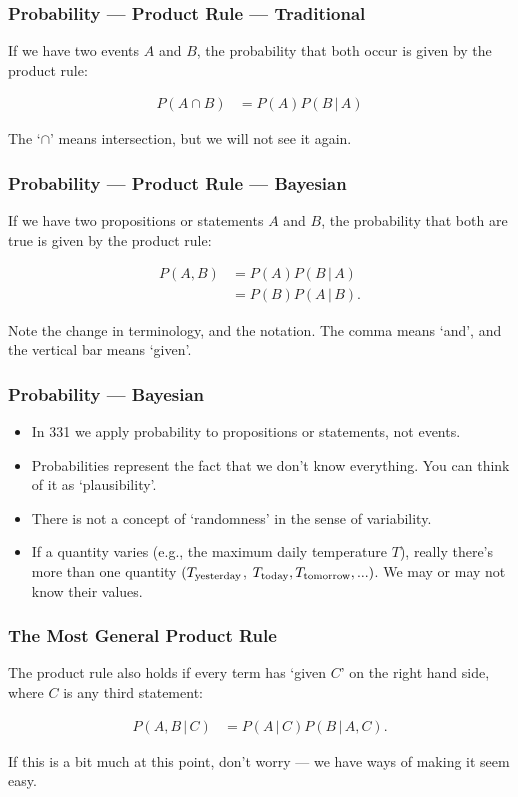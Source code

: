 \documentclass{beamer}
\newcommand{\given}{\,|\,}
\begin{document}
\begin{frame}
\frametitle{Probability --- Product Rule --- Traditional}
If we have two {\color{red} events} $A$ and $B$, the probability that both
{\color{red} occur} is given by the product rule:

\begin{align}
P(A \cap B) &= P(A)P(B \given A)
\end{align}

The `$\cap$' means intersection, but we will not see it again.



\end{frame}

\begin{frame}
\frametitle{Probability --- Product Rule --- Bayesian}
If we have two {\color{blue} propositions} or
{\color{blue} statements}
 $A$ and $B$, the probability that both {\color{blue} are true}
is given by the product rule:

\begin{align}
P(A, B) &= P(A)P(B \given A) \\
        &= P(B)P(A \given B).
\end{align}\pause

Note the change in terminology, and the notation. The comma means `and',
and the vertical bar means `given'.



\end{frame}


\begin{frame}
\frametitle{Probability --- Bayesian}
\begin{itemize}
\item In 331 we apply probability to {\color{blue} propositions
or statements}, not events. \pause
\item Probabilities represent the fact that we don't know everything.
You can think of it as `plausibility'. \pause
\item There is not a concept of `randomness' in the
sense of variability.\pause
\item If a quantity varies (e.g., the maximum daily temperature $T$),
really there’s more than one quantity
$(T_{\rm yesterday}$, $T_{\rm today}, T_{\rm tomorrow}, ...)$. We may or may
not know their values.
\end{itemize}

\end{frame}

\begin{frame}
\frametitle{The Most General Product Rule}
The product rule also holds if every term has `given $C$' on the right hand
side, where $C$ is any third statement:

\begin{align}
P(A, B \given C) &= P(A \given C)P(B \given A, C).
\end{align}\pause

If this is a bit much at this point, don't worry --- we have ways of making it
seem easy.

\end{frame}
\end{document}
